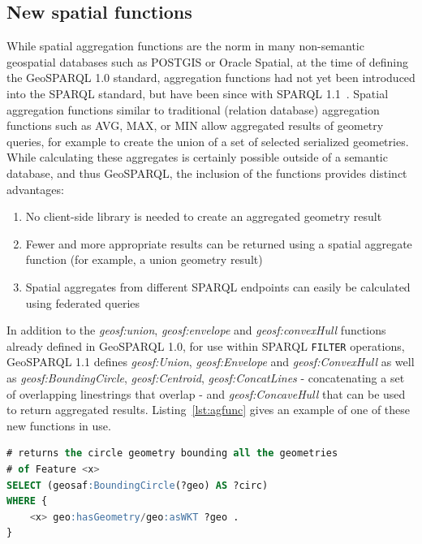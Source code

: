 \documentclass[runningheads]{llncs}
\begin{document}
\subsection{New spatial functions}\label{sec:newfunctions}
While spatial aggregation functions are the norm in many non-semantic geospatial databases such as POSTGIS or Oracle Spatial, 
at the time of defining the GeoSPARQL 1.0 standard, aggregation functions had not yet been introduced into the SPARQL standard,
but have been since with SPARQL 1.1~\cite{w3c_sparql_working_group_sparql_2013}. Spatial aggregation functions 
similar to traditional (relation database) aggregation functions such as AVG, MAX, or MIN allow aggregated results of geometry 
queries, for example to create the union of a set of selected serialized geometries. While calculating these aggregates is 
certainly possible outside of a semantic database, and thus GeoSPARQL, the inclusion of the functions provides distinct advantages:

\begin{enumerate}
    \item No client-side library is needed to create an aggregated geometry result
    \item Fewer and more appropriate results can be returned using a spatial aggregate function (for example, a union geometry result)
    \item Spatial aggregates from different SPARQL endpoints can easily be calculated using federated queries 
\end{enumerate}

In addition to the \emph{geosf:union}, \emph{geosf:envelope} and \emph{geosf:convexHull} functions already defined in GeoSPARQL 1.0, 
for use within SPARQL \texttt{FILTER} operations, GeoSPARQL 1.1 defines \emph{geosf:Union}, \emph{geosf:Envelope} and \emph{geosf:ConvexHull}
as well as \emph{geosf:BoundingCircle}, \emph{geosf:Centroid}, \emph{geosf:ConcatLines} - concatenating a set of overlapping linestrings 
that overlap - and \emph{geosf:ConcaveHull} that can be used to return aggregated results. Listing~\ref{lst:agfunc} gives an example 
of one of these new functions in use.

\small
\begin{lstlisting}[caption=Aggregation Function example SPARQL query,label=lst:agfunc,language=sql,frame=single,basicstyle=\ttfamily,showstringspaces=false]
# returns the circle geometry bounding all the geometries 
# of Feature <x>
SELECT (geosaf:BoundingCircle(?geo) AS ?circ)
WHERE {
    <x> geo:hasGeometry/geo:asWKT ?geo .
}
\end{lstlisting}
\normalsize
\end{document}
